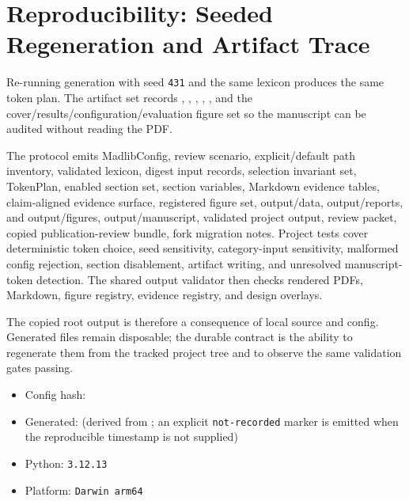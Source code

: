 \documentclass[
  english,
]{article}
\providecommand{\tightlist}{%
  \setlength{\itemsep}{0pt}\setlength{\parskip}{0pt}}
\begin{document}
\newpage

\section{Reproducibility: Seeded Regeneration and Artifact
Trace}\label{reproducibility-seeded-regeneration-and-artifact-trace}

Re-running generation with seed \texttt{431} and the same lexicon
produces the same token plan. The artifact set records
, ,
, ,
, and the
cover/results/configuration/evaluation figure set so the manuscript can
be audited without reading the PDF.

The protocol emits MadlibConfig, review scenario, explicit/default path
inventory, validated lexicon, digest input records, selection invariant
set, TokenPlan, enabled section set, section variables, Markdown
evidence tables, claim-aligned evidence surface, registered figure set,
output/data, output/reports, and output/figures, output/manuscript,
validated project output, review packet, copied publication-review
bundle, fork migration notes. Project tests cover deterministic token
choice, seed sensitivity, category-input sensitivity, malformed config
rejection, section disablement, artifact writing, and unresolved
manuscript-token detection. The shared output validator then checks
rendered PDFs, Markdown, figure registry, evidence registry, and design
overlays.

The copied root output is therefore a consequence of local source and
config. Generated files remain disposable; the durable contract is the
ability to regenerate them from the tracked project tree and to observe
the same validation gates passing.

\begin{itemize}
\tightlist
\item
  Config hash: 
\item
  Generated:  (derived
  from ; an explicit \texttt{not-recorded}
  marker is emitted when the reproducible timestamp is not supplied)
\item
  Python: \texttt{3.12.13}
\item
  Platform: \texttt{Darwin\ arm64}
\end{itemize}

\newpage
\end{document}
